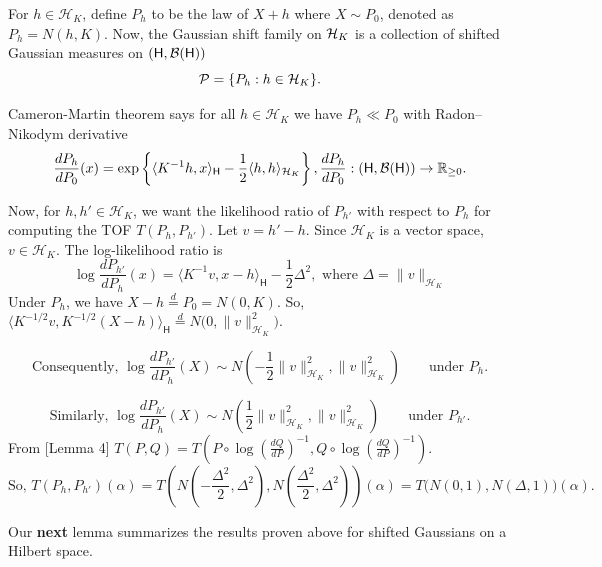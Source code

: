 For \(h\in\mathcal H_K\), define \(P_h\) to be the law of $X+h$ where  $X\sim P_0$, denoted as $P_h=N(h,K)$. Now, the Gaussian shift family on $\mathcal{H}_K$ is a collection of shifted Gaussian measures on $(\mathsf H, \mathcal{B}(\mathsf H))$
\[
    \mathcal{P}
    =
    \{P_h:h\in\mathcal H_K\}.
\]

Cameron-Martin theorem says for all \(h\in\mathcal H_K\) we have  $P_h\ll P_0$ with  Radon--Nikodym derivative
\[
    \frac{dP_h}{dP_0}(x)
    =
    \exp\left\{
        \langle K^{-1}h,x\rangle_{\mathsf H}
        -
        \frac12
        \langle h,h\rangle_{\mathcal{H}_{K}}
    \right\}, \frac{dP_h}{dP_0} : (\mathsf H , \mathcal{B}(\mathsf H)) \to \mathbb{R}_{\geq 0}.
\]


Now, for \(h,h'\in\mathcal H_K\), we want the likelihood ratio of $P_{h'}$ with respect to $P_h$ for computing the TOF $T(P_h, P_{h'})$. Let
$v=h'-h.$ Since \(\mathcal H_K\) is a vector space, \(v\in\mathcal H_K\). The log-likelihood ratio is
\[
    \log \frac{dP_{h'}}{dP_h}(x)
    =
    \langle K^{-1}v,x-h\rangle_{\mathsf H}- \frac12
        \Delta^2 , \text{ where } \Delta =\|v\|_{\mathcal H_K}
\]
Under \(P_h\), we have   \(X-h \overset{d}{=}P_0=N(0,K)\).
So, $\langle K^{-1/2} v, K^{-1/2}(X-h)\rangle_{\mathsf H}  \overset{d}{=}
    N\bigl(0,\|v\|_{\mathcal H_K}^2\bigr).$

\[
   \text{Consequently, } \log\frac{dP_{h'}}{dP_h}(X)
    \sim
    N\left(
        -\frac12\|v\|_{\mathcal H_K}^2,
        \|v\|_{\mathcal H_K}^2
    \right)
    \qquad\text{under }P_h.
\]

\[
    \text{Similarly, }\log\frac{dP_{h'}}{dP_h}(X)
    \sim
    N\left(
        \frac12\|v\|_{\mathcal H_K}^2,
        \|v\|_{\mathcal H_K}^2
    \right)
    \qquad\text{under }P_{h'}.
\]
From \citet{pandey2025infinitely}[Lemma 4]  $T(P,Q)= T\left(P \circ \log \left(\frac{dQ}{dP}\right)^{-1}, Q \circ \log \left( \frac{dQ}{dP}\right)^{-1}\right)$.
\[
   \text{So, } T(P_h,P_{h'})(\alpha)
    = 
    T\left(N\left(-\frac{\Delta^2}{2}, \Delta^2\right), N\left(\frac{\Delta^2}{2}, \Delta^2\right)\right)(\alpha)
    =
    T\bigl(N(0,1),N(\Delta,1)\bigr)(\alpha).
\]




Our \textbf{next} lemma summarizes the results proven above for shifted Gaussians on a Hilbert space.

